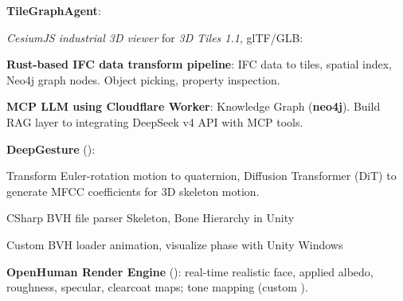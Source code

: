 
\begin{twocolentry}{}
	\textbf{TileGraphAgent}: 
	\begin{highlights}
		\item \textit{CesiumJS industrial 3D viewer} for \textit{3D Tiles 1.1}, glTF/GLB:  
		\item \textbf{Rust-based IFC data transform pipeline}: IFC data to tiles, spatial index, Neo4j graph nodes. Object picking, property inspection. 
		\item \textbf{MCP LLM using Cloudflare Worker}:  Knowledge Graph (\textbf{neo4j}). Build RAG layer to integrating DeepSeek v4 API with MCP tools.
	\end{highlights}
\end{twocolentry}


\begin{twocolentry}{}
	\textbf{DeepGesture} ():
	\begin{highlights}
		\item Transform Euler-rotation motion to quaternion, Diffusion Transformer (DiT) to generate MFCC coefficients for 3D skeleton motion.
		\item CSharp BVH file parser Skeleton, Bone Hierarchy in Unity
		\item Custom BVH loader animation, visualize phase with Unity Windows
	\end{highlights}
\end{twocolentry}




\begin{twocolentry}{}
	\textbf{OpenHuman Render Engine} (): real-time realistic face, applied albedo, roughness, specular, clearcoat maps; tone mapping (custom ).
\end{twocolentry}

